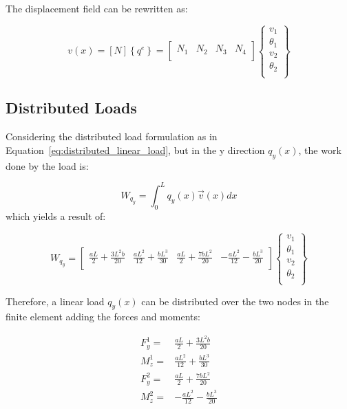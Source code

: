 The displacement field can be rewritten as:

\[
  v(x) = \left[ N \right] \left\{ q^e \right\} =
  \begin{bmatrix}
    N_1 & N_2 & N_3 & N_4 \\
  \end{bmatrix}
  \begin{Bmatrix}
    v_1 \\
    \theta_1 \\
    v_2 \\
    \theta_2 \\
  \end{Bmatrix}
\]


\subsection{Distributed Loads}

Considering the distributed load formulation as in Equation~\ref{eq:distributed_linear_load}, but in the y direction $q_y(x)$, the work done by the load is:

\[
  W_{q_y} = \int_0^L q_y(x) \vec{v}(x) dx
\]
which yields a result of:

\[
  W_{q_y} = 
  \begin{bmatrix}    
    \frac{aL}{2} + \frac{3 L^2 b}{20} & \frac{aL^2}{12} + \frac{bL^3}{30} & \frac{aL}{2} + \frac{7bL^2}{20} & -\frac{aL^2}{12} - \frac{bL^3}{20} \\
  \end{bmatrix}
  \begin{Bmatrix}
    v_1 \\
    \theta_1 \\
    v_2 \\
    \theta_2 \\
  \end{Bmatrix}
\]

Therefore, a linear load $q_y(x)$ can be distributed over the two nodes in the finite element adding the forces and moments:

\begin{equation}
  \begin{split}
    F_y^1 = & \frac{aL}{2} + \frac{3 L^2 b}{20} \\
    M_z^1 = & \frac{aL^2}{12} + \frac{bL^3}{30} \\
    F_y^2 = & \frac{aL}{2} + \frac{7bL^2}{20} \\
    M_z^2 = & -\frac{aL^2}{12} - \frac{bL^3}{20} \\
  \end{split}
\end{equation}

